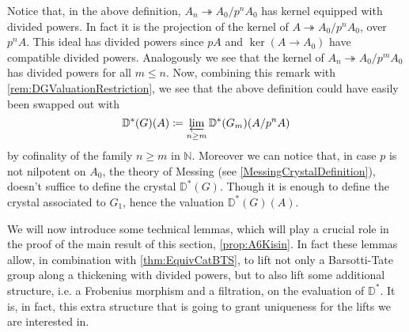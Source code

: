 \begin{rem}[]\label{rem:NonNilpotentCrystalEvaluation}
	Notice that, in the above definition, $A_n \twoheadrightarrow A_0/p^nA_0$
	has kernel equipped with divided powers.
	In fact it is the projection of the kernel of $A \twoheadrightarrow A_0/p^nA_0$, over
	$p^nA$.
	This ideal has divided powers since $pA$ and $\ker (A \to A_0)$ have compatible
	divided powers.
	Analogously we see that the kernel of $A_n \twoheadrightarrow A_0/p^mA_0$
	has divided powers for all $m \leq n$.
	Now, combining this remark with \cref{rem:DGValuationRestriction},
	we see that the above definition could have easily been swapped out with
	\begin{equation*}
		\mathbb{D}^*(G)(A) \coloneqq
		\varprojlim_{n \geq m} \mathbb{D}^*(G_m)(A/p^nA)
	\end{equation*}
	by cofinality of the family $n \geq m$ in $\mathbb{N}$.
	Moreover we can notice that, in case $p$ is not nilpotent
	on $A_0$, the theory of Messing (see \cref{MessingCrystalDefinition}),
	doesn't suffice to define the crystal $\mathbb{D}^*(G)$.
	Though it is enough to define the crystal associated to
	$G_1$, hence the valuation $\mathbb{D}^*(G)(A)$.
\end{rem}


\begin{rem}[]
	We will now introduce some technical lemmas, which will play a crucial role
	in the proof of the main result of this section, \cref{prop:A6Kisin}.
	In fact these lemmas allow, in combination with \cref{thm:EquivCatBTS},
	to lift not only a Barsotti-Tate group along a thickening with divided
	powers, but to also lift some additional structure, i.e.
	a Frobenius morphism and a filtration, on the evaluation of $\mathbb{D}^*$.
	It is, in fact, this extra structure that is going to grant
	uniqueness for the lifts we are interested in.
\end{rem}


